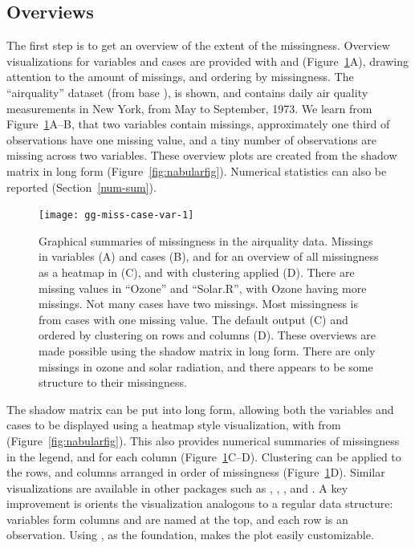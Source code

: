 \documentclass[article]{jss}
\begin{document}
\hypertarget{overviews}{%
\subsection{Overviews}\label{overviews}}

The first step is to get an overview of the extent of the missingness.
Overview visualizations for variables and cases are provided with
 and 
(Figure~\ref{fig:gg-miss-case-var}A), drawing attention to the amount of
missings, and ordering by missingness.  The ``airquality'' dataset (from
base ), is shown, and contains daily air quality measurements in
New York, from May to September, 1973.  We learn from
Figure~\ref{fig:gg-miss-case-var}A--B, that two variables contain missings,
approximately one third of observations have one missing value, and a tiny
number of observations are missing across two variables.  These overview
plots are created from the shadow matrix in long form
(Figure~\ref{fig:nabularfig}).  Numerical statistics can also be reported
(Section~\ref{num-sum}).

\begin{figure}
\centering
\texttt{[image: gg-miss-case-var-1]}
\caption[Graphical summaries of missingness in the airquality
data]{Graphical summaries of missingness in the airquality data.  Missings
in variables (A) and cases (B), and for an overview of all missingness as a
heatmap in (C), and with clustering applied (D).  There are missing values
in ``Ozone'' and ``Solar.R'', with Ozone having more missings.  Not many cases have
two missings.  Most missingness is from cases with one missing value.  The
default output (C) and ordered by clustering on rows and columns (D).  These
overviews are made possible using the shadow matrix in long form.  There are
only missings in ozone and solar radiation, and there appears to be some
structure to their missingness.}\label{fig:gg-miss-case-var}
\end{figure}

The shadow matrix can be put into long form, allowing both the variables and
cases to be displayed using a heatmap style visualization, with
 from  \citep{visdat}
(Figure~\ref{fig:nabularfig}).  This also provides numerical summaries of
missingness in the legend, and for each column
(Figure~\ref{fig:gg-miss-case-var}C--D).  Clustering can be applied to the
rows, and columns arranged in order of missingness
(Figure~\ref{fig:gg-miss-case-var}D).  Similar visualizations are available
in other packages such as , , , and
.  A key improvement is  orients the
visualization analogous to a regular data structure: variables form columns
and are named at the top, and each row is an observation.  Using
, as the foundation, makes the plot easily customizable.
\end{document}
